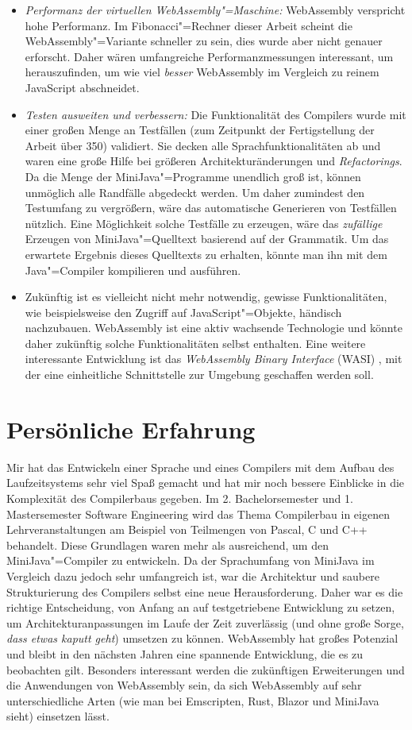 \begin{itemize}
    \item \emph{Performanz der virtuellen WebAssembly"=Maschine:} WebAssembly verspricht hohe Performanz. Im Fibonacci"=Rechner dieser Arbeit scheint die WebAssembly"=Variante schneller zu sein, dies wurde aber nicht genauer erforscht. Daher wären umfangreiche Performanzmessungen interessant, um herauszufinden, um wie viel \emph{besser} WebAssembly im Vergleich zu reinem JavaScript abschneidet.
    \item \emph{Testen ausweiten und verbessern:} Die Funktionalität des Compilers wurde mit einer großen Menge an Testfällen (zum Zeitpunkt der Fertigstellung der Arbeit über 350) validiert. Sie decken alle Sprachfunktionalitäten ab und waren eine große Hilfe bei größeren Architekturänderungen und \emph{Refactorings}. Da die Menge der MiniJava"=Programme unendlich groß ist, können unmöglich alle Randfälle abgedeckt werden. Um daher zumindest den Testumfang zu vergrößern, wäre das automatische Generieren von Testfällen nützlich. Eine Möglichkeit solche Testfälle zu erzeugen, wäre das \emph{zufällige} Erzeugen von MiniJava"=Quelltext basierend auf der Grammatik. Um das erwartete Ergebnis dieses Quelltexts zu erhalten, könnte man ihn mit dem Java"=Compiler kompilieren und ausführen.
    \item Zukünftig ist es vielleicht nicht mehr notwendig, gewisse Funktionalitäten, wie beispielsweise den Zugriff auf JavaScript"=Objekte, händisch nachzubauen. WebAssembly ist eine aktiv wachsende Technologie und könnte daher zukünftig solche Funktionalitäten selbst enthalten. Eine weitere interessante Entwicklung ist das \emph{WebAssembly Binary Interface} (WASI) \cite{WASI}, mit der eine einheitliche Schnittstelle zur Umgebung geschaffen werden soll.
\end{itemize}

\section{Persönliche Erfahrung}

Mir hat das Entwickeln einer Sprache und eines Compilers mit dem Aufbau des Laufzeitsystems sehr viel Spaß gemacht und hat mir noch bessere Einblicke in die Komplexität des Compilerbaus gegeben. Im 2. Bachelorsemester und 1. Mastersemester Software Engineering wird das Thema Compilerbau in eigenen Lehrveranstaltungen am Beispiel von Teilmengen von Pascal, C und C++ behandelt. Diese Grundlagen waren mehr als ausreichend, um den MiniJava"=Compiler zu entwickeln. Da der Sprachumfang von MiniJava im Vergleich dazu jedoch sehr umfangreich ist, war die Architektur und saubere Strukturierung des Compilers selbst eine neue Herausforderung. Daher war es die richtige Entscheidung, von Anfang an auf testgetriebene Entwicklung zu setzen, um Architekturanpassungen im Laufe der Zeit zuverlässig (und ohne große Sorge, \emph{dass etwas kaputt geht}) umsetzen zu können. WebAssembly hat großes Potenzial und bleibt in den nächsten Jahren eine spannende Entwicklung, die es zu beobachten gilt. Besonders interessant werden die zukünftigen Erweiterungen und die Anwendungen von WebAssembly sein, da sich WebAssembly auf sehr unterschiedliche Arten (wie man bei Emscripten, Rust, Blazor und MiniJava sieht) einsetzen lässt.
